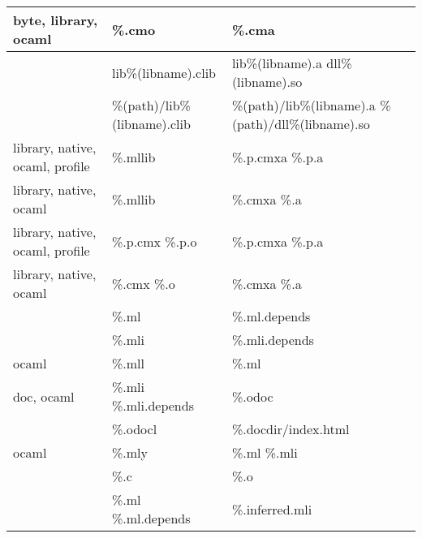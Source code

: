 \documentclass[9pt]{article}
\begin{document}
\begin{center}
\begin{tabular}{|l|l|p{5cm}|}
  \hline
   byte, library, ocaml &  \%.cmo  &  \%.cma  \\
  \hline
    & lib\%(libname).clib & lib\%(libname).a dll\%(libname).so  \\
  \hline
    & \%(path)/lib\%(libname).clib & \%(path)/lib\%(libname).a \%(path)/dll\%(libname).so \\
  \hline
   library, native, ocaml, profile & \%.mllib  &  \%.p.cmxa \%.p.a  \\
  \hline
   library, native, ocaml &  \%.mllib  & \%.cmxa \%.a  \\
  \hline
   library, native, ocaml, profile & \%.p.cmx \%.p.o  &  \%.p.cmxa \%.p.a  \\
  \hline
   library, native, ocaml &  \%.cmx \%.o  & \%.cmxa \%.a  \\
  \hline
    &  \%.ml  &  \%.ml.depends  \\
  \hline
    &  \%.mli  &  \%.mli.depends  \\
  \hline
   ocaml &  \%.mll  &  \%.ml  \\
  \hline
   doc, ocaml &  \%.mli \%.mli.depends  &  \%.odoc  \\
  \hline
    &  \%.odocl  & \%.docdir/index.html \\
  \hline
   ocaml &  \%.mly  &  \%.ml \%.mli  \\
  \hline
    &  \%.c  &  \%.o  \\
  \hline
    &  \%.ml \%.ml.depends  & \%.inferred.mli  \\
  \hline
\end{tabular}
\end{center}
\end{document}
